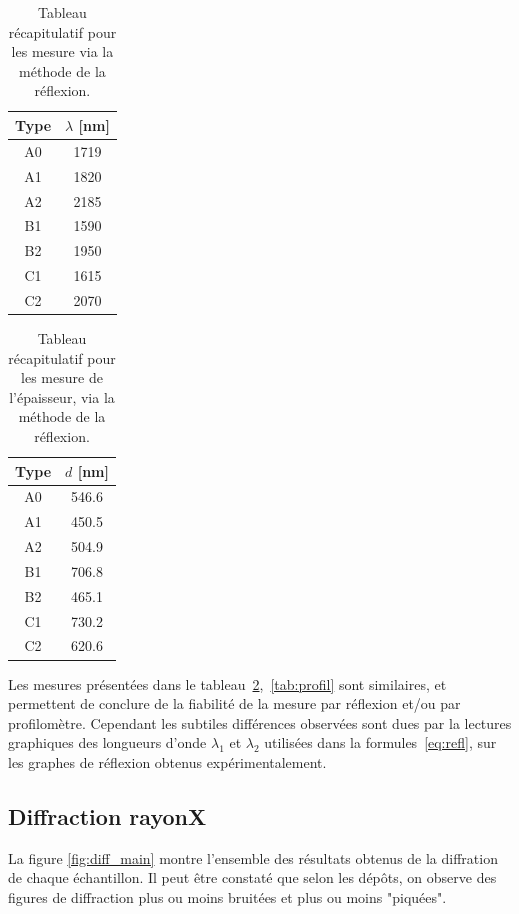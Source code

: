 \documentclass[a4paper,12pt,oneside]{article}
\begin{document}
\begin{table}[ht]
   \centering
   \begin{tabular}{|c|c|}
	  \hline
      Type & $\lambda$ [nm]\\
      \hline
      A0 & 1719 \\
      A1 & 1820 \\
      A2 & 2185 \\
      B1 & 1590 \\
      B2 & 1950 \\
      C1 & 1615 \\
      C2 & 2070 \\
      \hline
   \end{tabular}
   \caption{Tableau récapitulatif pour les mesure via la méthode de la réflexion.}\label{tab:reflexion}
\end{table}

\begin{table}[ht]
   \centering
   \begin{tabular}{|c|c|}
	  \hline
      Type & $d$ [nm]\\
      \hline
      A0 & 546.6 \\
      A1 & 450.5 \\
      A2 & 504.9 \\
      B1 & 706.8 \\
      B2 & 465.1 \\
      C1 & 730.2 \\
      C2 & 620.6 \\
      \hline
   \end{tabular}
   \caption{Tableau récapitulatif pour les mesure de l'épaisseur, via la méthode de la réflexion.}\label{tab:epaisseur}
\end{table}

Les mesures présentées dans le tableau~\ref{tab:epaisseur},~\ref{tab:profil} sont similaires, et permettent de conclure de la fiabilité de la mesure par réflexion et/ou par profilomètre. Cependant les subtiles différences observées sont dues par la lectures graphiques des longueurs d'onde $\lambda_1$ et $\lambda_2$ utilisées dans la formules~\ref{eq:refl}, sur les graphes de réflexion obtenus expérimentalement.

\subsection{Diffraction rayonX}
La figure \ref{fig:diff_main} montre l'ensemble des résultats obtenus de la diffration de chaque échantillon. Il peut être constaté que selon les dépôts, on observe des figures de diffraction plus ou moins bruitées et plus ou moins "piquées".
\end{document}
